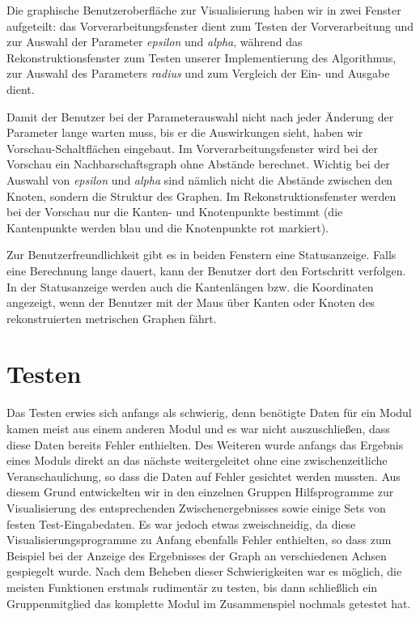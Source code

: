 \documentclass[parskip=half,
 fontsize=12pt, bibtotoc,
 titlepage, ngerman]
 {article}
\begin{document}
Die graphische Benutzeroberfläche zur Visualisierung haben wir in zwei Fenster aufgeteilt: das Vorverarbeitungsfenster dient zum Testen der Vorverarbeitung und zur Auswahl der Parameter \emph{epsilon} und \emph{alpha}, während das Rekonstruktionsfenster zum Testen unserer Implementierung des Algorithmus, zur Auswahl des Parameters \emph{radius} und zum Vergleich der Ein- und Ausgabe dient.

Damit der Benutzer bei der Parameterauswahl nicht nach jeder Änderung der Parameter lange warten muss, bis er die Auswirkungen sieht, haben wir Vorschau-Schaltflächen eingebaut. Im Vorverarbeitungsfenster wird bei der Vorschau ein Nachbarschaftsgraph ohne Abstände berechnet. Wichtig bei der Auswahl von \emph{epsilon} und \emph{alpha} sind nämlich nicht die Abstände zwischen den Knoten, sondern die Struktur des Graphen. Im Rekonstruktionsfenster werden bei der Vorschau nur die Kanten- und Knotenpunkte bestimmt (die Kantenpunkte werden blau und die Knotenpunkte rot markiert).

Zur Benutzerfreundlichkeit gibt es in beiden Fenstern eine Statusanzeige. Falls eine Berechnung lange dauert, kann der Benutzer dort den Fortschritt verfolgen. In der Statusanzeige werden auch die Kantenlängen bzw. die Koordinaten angezeigt, wenn der Benutzer mit der Maus über Kanten oder Knoten des rekonstruierten metrischen Graphen fährt.

\section{Testen}

Das Testen erwies sich anfangs als schwierig, denn benötigte Daten für ein Modul kamen meist aus einem anderen Modul und es war nicht auszuschließen, dass diese Daten bereits Fehler enthielten. Des Weiteren wurde anfangs das Ergebnis eines Moduls direkt an das nächste weitergeleitet ohne eine zwischenzeitliche Veranschaulichung, so dass die Daten auf Fehler gesichtet werden mussten. Aus diesem Grund entwickelten wir in den einzelnen Gruppen Hilfsprogramme zur Visualisierung des entsprechenden Zwischenergebnisses sowie einige Sets von festen Test-Eingabedaten. Es war jedoch etwas zweischneidig, da diese Visualisierungsprogramme zu Anfang ebenfalls Fehler enthielten, so dass zum Beispiel bei der Anzeige des Ergebnisses der Graph an verschiedenen Achsen gespiegelt wurde. Nach dem Beheben dieser Schwierigkeiten war es möglich, die meisten Funktionen erstmals rudimentär zu testen, bis dann schließlich ein Gruppenmitglied das komplette Modul im Zusammenspiel nochmals getestet hat.
\end{document}
